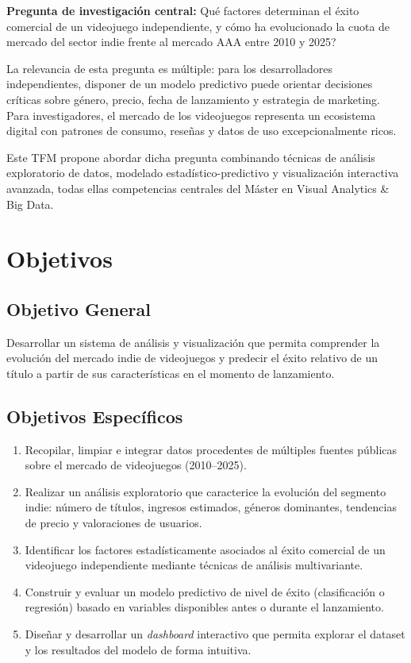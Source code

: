 \documentclass[12pt, a4paper]{article}
\begin{document}
\begin{destacado}
\textbf{Pregunta de investigaci\'on central:} \textquestiondown{}Qu\'e factores 
determinan el \'exito comercial de un videojuego independiente, y c\'omo ha 
evolucionado la cuota de mercado del sector indie frente al mercado AAA entre 2010 y 
2025?
\end{destacado}

La relevancia de esta pregunta es m\'ultiple: para los desarrolladores independientes, 
disponer de un modelo predictivo puede orientar decisiones cr\'iticas sobre g\'enero, 
precio, fecha de lanzamiento y estrategia de marketing. Para investigadores, el 
mercado de los videojuegos representa un ecosistema digital con patrones de consumo, 
rese\~nas y datos de uso excepcionalmente ricos.

Este TFM propone abordar dicha pregunta combinando t\'ecnicas de an\'alisis 
exploratorio de datos, modelado estad\'istico-predictivo y visualizaci\'on interactiva 
avanzada, todas ellas competencias centrales del M\'aster en Visual Analytics \& Big 
Data.

\section{Objetivos}

\subsection{Objetivo General}

Desarrollar un sistema de an\'alisis y visualizaci\'on que permita comprender la evoluci\'on del mercado indie de videojuegos y predecir el \'exito relativo de un t\'itulo a partir de sus caracter\'isticas en el momento de lanzamiento.

\subsection{Objetivos Espec\'ificos}

\begin{enumerate}[leftmargin=*, label=\textbf{OE\arabic*.}]
  \item Recopilar, limpiar e integrar datos procedentes de m\'ultiples fuentes p\'ublicas sobre el mercado de videojuegos (2010--2025).
  \item Realizar un an\'alisis exploratorio que caracterice la evoluci\'on del segmento indie: n\'umero de t\'itulos, ingresos estimados, g\'eneros dominantes, tendencias de precio y valoraciones de usuarios.
  \item Identificar los factores estad\'isticamente asociados al \'exito comercial de un videojuego independiente mediante t\'ecnicas de an\'alisis multivariante.
  \item Construir y evaluar un modelo predictivo de nivel de \'exito (clasificaci\'on o regresi\'on) basado en variables disponibles antes o durante el lanzamiento.
  \item Dise\~nar y desarrollar un \textit{dashboard} interactivo que permita explorar el dataset y los resultados del modelo de forma intuitiva.
\end{enumerate}
\end{document}

